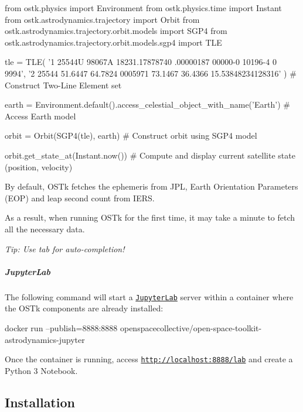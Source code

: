 \begin{DoxyCode}
\textcolor{keyword}{from} ostk.physics \textcolor{keyword}{import} Environment
\textcolor{keyword}{from} ostk.physics.time \textcolor{keyword}{import} Instant
\textcolor{keyword}{from} ostk.astrodynamics.trajectory \textcolor{keyword}{import} Orbit
\textcolor{keyword}{from} ostk.astrodynamics.trajectory.orbit.models \textcolor{keyword}{import} SGP4
\textcolor{keyword}{from} ostk.astrodynamics.trajectory.orbit.models.sgp4 \textcolor{keyword}{import} TLE

tle = TLE(
    \textcolor{stringliteral}{'1 25544U 98067A   18231.17878740  .00000187  00000-0  10196-4 0  9994'},
    \textcolor{stringliteral}{'2 25544  51.6447  64.7824 0005971  73.1467  36.4366 15.53848234128316'}
) \textcolor{comment}{# Construct Two-Line Element set}

earth = Environment.default().access\_celestial\_object\_with\_name(\textcolor{stringliteral}{'Earth'}) \textcolor{comment}{# Access Earth model}

orbit = Orbit(SGP4(tle), earth) \textcolor{comment}{# Construct orbit using SGP4 model}

orbit.get\_state\_at(Instant.now()) \textcolor{comment}{# Compute and display current satellite state (position, velocity)}
\end{DoxyCode}


By default, O\+S\+Tk fetches the ephemeris from J\+PL, Earth Orientation Parameters (E\+OP) and leap second count from I\+E\+RS.

As a result, when running O\+S\+Tk for the first time, it may take a minute to fetch all the necessary data.

{\itshape Tip\+: Use tab for auto-\/completion!}

\subparagraph*{Jupyter\+Lab}

The following command will start a \href{https://jupyterlab.readthedocs.io/en/stable/}{\tt Jupyter\+Lab} server within a container where the O\+S\+Tk components are already installed\+:


\begin{DoxyCode}
docker run --publish=8888:8888 openspacecollective/open-space-toolkit-astrodynamics-jupyter
\end{DoxyCode}


Once the container is running, access \href{http://localhost:8888/lab}{\tt http\+://localhost\+:8888/lab} and create a Python 3 Notebook.

\subsection*{Installation}

